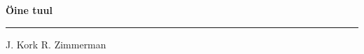 \documentclass[10pt]{book}
\begin{document}
{
  \samepage
  \raggedbottom
  \raggedright
  \sloppy


  \vspace{0.2in}

  \noindent\begin{minipage}{.1\textwidth}
    \hfill\vspace{0.1in}
  \end{minipage}%
  \noindent\begin{minipage}{.8\textwidth}
    \centering
    \bfseries
    \large \"Oine tuul
  \end{minipage}%
  \noindent\begin{minipage}{.1\textwidth}
      \hfill\vspace{0.1in}
  \end{minipage}

  \nopagebreak[4]
  \vspace{0.1in}
  \nopagebreak[4]
  \hrule height 0.05ex
  \nopagebreak[4]
  \vspace{-0.05in}

  {\footnotesize J. Kork \hfill R. Zimmerman }\\
  \vspace{0.01in}



}
\end{document}
